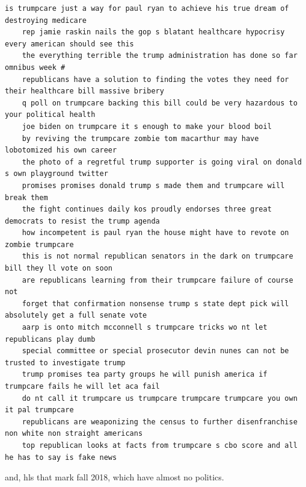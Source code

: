 \documentclass{scrartcl}
\begin{document}
\begin{lstlisting}[basicstyle=\tiny\hlfont]
    is trumpcare just a way for paul ryan to achieve his true dream of destroying medicare
    rep jamie raskin nails the gop s blatant healthcare hypocrisy every american should see this
    the everything terrible the trump administration has done so far omnibus week #
    republicans have a solution to finding the votes they need for their healthcare bill massive bribery
    q poll on trumpcare backing this bill could be very hazardous to your political health
    joe biden on trumpcare it s enough to make your blood boil
    by reviving the trumpcare zombie tom macarthur may have lobotomized his own career
    the photo of a regretful trump supporter is going viral on donald s own playground twitter
    promises promises donald trump s made them and trumpcare will break them
    the fight continues daily kos proudly endorses three great democrats to resist the trump agenda
    how incompetent is paul ryan the house might have to revote on zombie trumpcare
    this is not normal republican senators in the dark on trumpcare bill they ll vote on soon
    are republicans learning from their trumpcare failure of course not
    forget that confirmation nonsense trump s state dept pick will absolutely get a full senate vote
    aarp is onto mitch mcconnell s trumpcare tricks wo nt let republicans play dumb
    special committee or special prosecutor devin nunes can not be trusted to investigate trump
    trump promises tea party groups he will punish america if trumpcare fails he will let aca fail
    do nt call it trumpcare us trumpcare trumpcare trumpcare you own it pal trumpcare
    republicans are weaponizing the census to further disenfranchise non white non straight americans
    top republican looks at facts from trumpcare s cbo score and all he has to say is fake news
\end{lstlisting}

and, hls that mark fall 2018, which have almost no politics.
\end{document}
